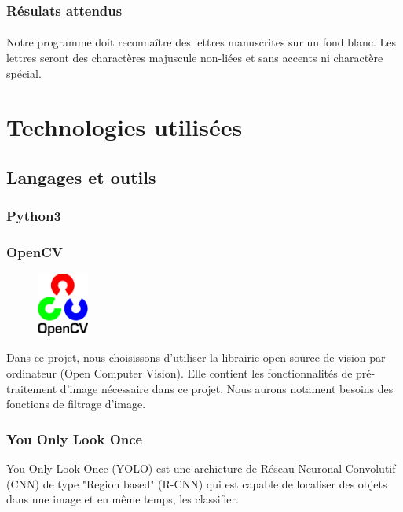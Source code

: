 \documentclass[a4paper]{article}
\begin{document}
			\subsubsection{Résulats attendus}
				\paragraph{}
					Notre programme doit reconnaître des lettres manuscrites sur un fond blanc. Les lettres seront des charactères majuscule non-liées et sans accents ni charactère spécial.
	\section{Technologies utilisées} 
		\subsection{Langages et outils}
			\subsubsection{Python3}
			\subsubsection{OpenCV}
				\begin{figure}
					\includegraphics[width=0.15\textwidth]{OpenCV.png}
				\end{figure}
				Dans ce projet, nous choisissons d'utiliser la librairie open source de vision par ordinateur (Open Computer Vision). Elle contient les fonctionnalités de pré-traitement d'image nécessaire dans ce projet. Nous aurons notament besoins des fonctions de filtrage d'image.
				\newline
			\subsubsection{You Only Look Once}
				You Only Look Once (YOLO) est une archicture de Réseau Neuronal Convolutif (CNN) de type "Region based" (R-CNN) qui est capable de localiser des objets dans une image et en même temps, les classifier.
\end{document}
